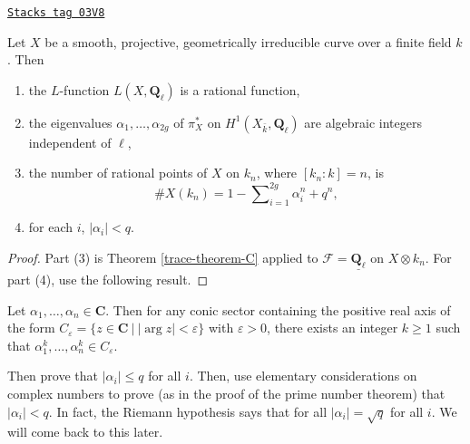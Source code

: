 \begin{lemma}
\label{trace-lemma-count-points-projective}
\href{https://stacks.math.columbia.edu/tag/03V8}{\texttt{Stacks tag 03V8}}

Let $X$ be a smooth, projective, geometrically irreducible
curve over a finite field $k$. Then
\begin{enumerate}
\item the $L$-function $L(X, \mathbf{Q}_\ell)$ is a rational function,
\item the eigenvalues $\alpha_1, \ldots, \alpha_{2g}$ of $\pi_X^*$ on
$H^1(X_{\bar k}, \mathbf{Q}_\ell)$ are algebraic integers
independent of $\ell$,
\item the number of rational points of $X$ on $k_n$, where $[k_n : k] = n$, is
$$
\# X(k_n) = 1 - \sum\nolimits_{i = 1}^{2g}\alpha_i^n + q^n,
$$
\item for each $i$, $|\alpha_i| < q$.
\end{enumerate}
\end{lemma}

\begin{proof}

Part (3) is Theorem \ref{trace-theorem-C} applied to $\mathcal{F} =
\underline{\mathbf{Q}_\ell}$ on $X \otimes k_n$. For part (4), use the
following result.
\end{proof}

\begin{exercise}
\label{exercise-powers}
Let $\alpha_1, \ldots, \alpha_n \in \mathbf{C}$. Then for any conic sector
containing the positive real axis of the form $C_\varepsilon = \{ z \in
\mathbf{C} \ | \ |\arg z| < \varepsilon \}$ with $\varepsilon > 0$, there exists
an integer $k \geq 1$ such that $\alpha_1^k, \ldots, \alpha_n^k \in
C_\varepsilon$.
\end{exercise}

Then prove that $|\alpha_i| \leq q$ for all $i$. Then, use elementary
considerations on complex numbers to prove (as in the proof of the prime number
theorem) that $|\alpha_i| < q$. In fact, the Riemann hypothesis says that for
all $|\alpha_i| = \sqrt{q}$ for all $i$. We will come back to this later.

